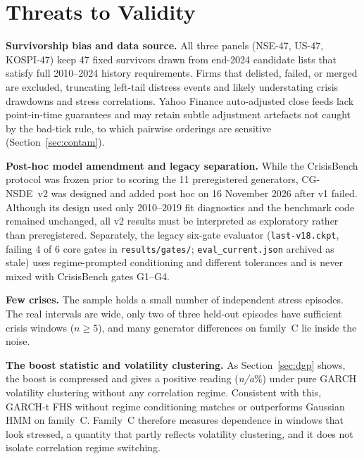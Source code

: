 \documentclass[journal]{IEEEtran}
\newcommand{\pendingnum}{\textit{n/a}}
\providecommand{\dgpSimCccBoost}{\pendingnum}
\newcommand{\maybetable}[1]{\IfFileExists{#1}{}{\textit{(pending)}}}
\begin{document}
\begin{table}[t]
\caption{Verdicts on the preregistered hypotheses and gates (and disclosed post-hoc v2 rows), as generated by
the analysis code.}
\label{tab:verdicts}
\centering
\footnotesize
\maybetable{tables/t8_hypotheses.tex}
\end{table}

\section{Threats to Validity}
\label{sec:threats}
\textbf{Survivorship bias and data source.} All three panels (NSE-47, US-47, KOSPI-47) keep 47 fixed
survivors drawn from end-2024 candidate lists that satisfy full 2010--2024 history requirements. Firms that
delisted, failed, or merged are excluded, truncating left-tail distress events and likely understating crisis
drawdowns and stress correlations. Yahoo Finance auto-adjusted close feeds lack point-in-time guarantees and
may retain subtle adjustment artefacts not caught by the bad-tick rule, to which pairwise orderings are
sensitive (Section~\ref{sec:contam}).

\textbf{Post-hoc model amendment and legacy separation.} While the CrisisBench protocol was frozen prior to
scoring the 11 preregistered generators, CG-NSDE~v2 was designed and added post hoc on 16 November 2026
after v1 failed. Although its design used only 2010--2019 fit diagnostics and the benchmark code remained
unchanged, all v2 results must be interpreted as exploratory rather than preregistered. Separately, the
legacy six-gate evaluator (\texttt{last-v18.ckpt}, failing 4 of 6 core gates in \texttt{results/gates/};
\texttt{eval\_current.json}
archived as stale) uses regime-prompted conditioning and different tolerances and is never mixed with
CrisisBench gates G1--G4.

\textbf{Few crises.} The sample holds a small number of independent stress episodes. The real intervals are
wide, only two of three held-out episodes have sufficient crisis windows ($n\ge 5$), and many generator
differences on family~C lie inside the noise.

\textbf{The boost statistic and volatility clustering.} As Section~\ref{sec:dgp} shows, the boost is
compressed and gives a positive reading (\dgpSimCccBoost\%) under pure GARCH volatility clustering without
any correlation regime. Consistent with this, GARCH-t FHS without regime conditioning matches or outperforms
Gaussian HMM on family~C. Family~C therefore measures dependence in windows that look stressed, a quantity
that partly reflects volatility clustering, and it does not isolate correlation regime switching.
\end{document}
